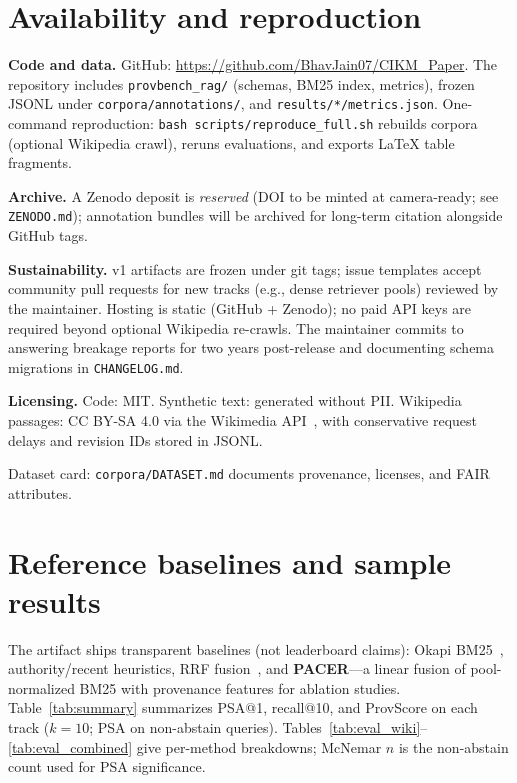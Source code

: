 \documentclass[sigconf]{acmart}
\begin{document}
\section{Availability and reproduction}
\label{sec:avail}
\textbf{Code and data.} GitHub: \url{https://github.com/BhavJain07/CIKM_Paper}.
The repository includes \texttt{provbench\_rag/} (schemas, BM25 index, metrics), frozen JSONL under \texttt{corpora/annotations/}, and \texttt{results/*/metrics.json}.
One-command reproduction: \texttt{bash scripts/reproduce\_full.sh} rebuilds corpora (optional Wikipedia crawl), reruns evaluations, and exports LaTeX table fragments.

\textbf{Archive.} A Zenodo deposit is \emph{reserved} (DOI to be minted at camera-ready; see \texttt{ZENODO.md}); annotation bundles will be archived for long-term citation alongside GitHub tags.

\textbf{Sustainability.} v1 artifacts are frozen under git tags; issue templates accept community pull requests for new tracks (e.g., dense retriever pools) reviewed by the maintainer.
Hosting is static (GitHub + Zenodo); no paid API keys are required beyond optional Wikipedia re-crawls.
The maintainer commits to answering breakage reports for two years post-release and documenting schema migrations in \texttt{CHANGELOG.md}.

\textbf{Licensing.} Code: MIT. Synthetic text: generated without PII. Wikipedia passages: CC BY-SA 4.0 via the Wikimedia API~\cite{wiki_api}, with conservative request delays and revision IDs stored in JSONL.

Dataset card: \texttt{corpora/DATASET.md} documents provenance, licenses, and FAIR attributes.

\section{Reference baselines and sample results}
The artifact ships transparent baselines (not leaderboard claims): Okapi BM25~\cite{robertson2009bm25}, authority/recent heuristics, RRF fusion~\cite{cormack2009rrf}, and \textbf{PACER}---a linear fusion of pool-normalized BM25 with provenance features for ablation studies.
Table~\ref{tab:summary} summarizes PSA@1, recall@10, and ProvScore on each track ($k{=}10$; PSA on non-abstain queries).
Tables~\ref{tab:eval_wiki}--\ref{tab:eval_combined} give per-method breakdowns; McNemar $n$ is the non-abstain count used for PSA significance.
\end{document}
